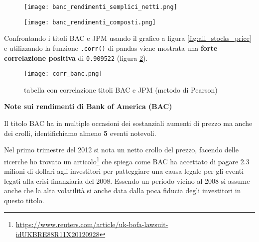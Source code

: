 \begin{figure}[h]
  \centering
  \begin{minipage}{.5\textwidth}
    \centering
    \texttt{[image: banc\_rendimenti\_semplici\_netti.png]}
    \label{fig:rendimenti_semplici_banc}
  \end{minipage}%
  \begin{minipage}{.5\textwidth}
    \centering
    \texttt{[image: banc\_rendimenti\_composti.png]}
    \label{fig:rendimenti_compositi_banc}
  \end{minipage}
\end{figure}

Confrontando i titoli BAC e JPM usando il grafico a figura \ref{fig:all_stocks_price} e utilizzando la funzione \verb|.corr()| di pandas
viene mostrata una \textbf{forte correlazione positiva} di \verb|0.909522| (figura \ref{fig:corr_banc}).

\begin{figure}[h]
  \centering
  \texttt{[image: corr\_banc.png]}
  \caption{tabella con correlazione titoli BAC e JPM (metodo di Pearson)}
  \label{fig:corr_banc}
\end{figure}

\textbf{Note sui rendimenti di Bank of America (BAC)}

Il titolo BAC ha in multiple occasioni dei sostanziali aumenti di prezzo ma anche dei crolli, identifichiamo almeno \textbf{5} eventi notevoli.

Nel primo trimestre del 2012 si nota un netto crollo del prezzo, facendo delle ricerche ho trovato un 
articolo\footnote{
  \href{https://www.reuters.com/article/uk-bofa-lawsuit-idUKBRE88R11X20120928}{https://www.reuters.com/article/uk-bofa-lawsuit-idUKBRE88R11X20120928}
}
che spiega come BAC ha accettato di pagare 2.3 milioni di dollari agli investitori per patteggiare una causa legale per gli eventi legati alla crisi finanziaria del 2008.
Essendo un periodo vicino al 2008 si assume anche che la alta volatilità si anche data dalla poca fiducia degli investitori in questo titolo.

